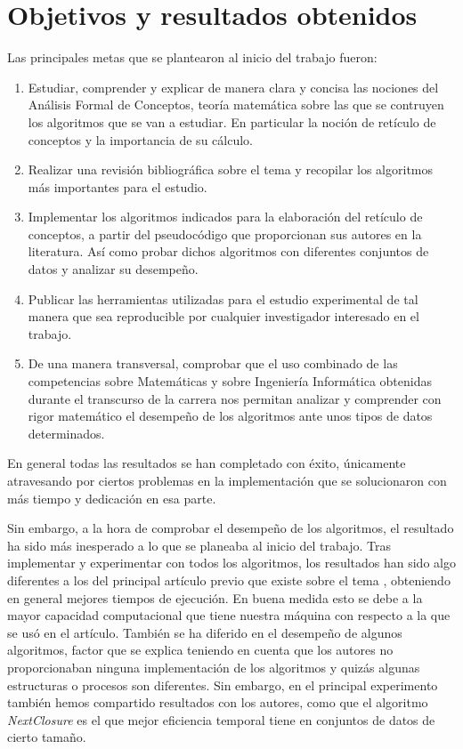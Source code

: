 \documentclass[oneside,openright,titlepage,numbers=noenddot,openany,headinclude,footinclude=true,
cleardoublepage=empty,abstractoff,BCOR=5mm,paper=a4,fontsize=12pt,main=spanish]{scrreprt}
\begin{document}
\section{Objetivos y resultados obtenidos}

Las principales metas que se plantearon al inicio del trabajo fueron:

\begin{enumerate}
    \item Estudiar, comprender y explicar de manera clara y concisa las nociones del Análisis Formal de Conceptos, teoría matemática sobre las que se contruyen los algoritmos que se van a estudiar. En particular la noción de retículo de conceptos y la importancia de su cálculo.
    \item Realizar una revisión bibliográfica sobre el tema y recopilar los algoritmos más importantes para el estudio.
    \item Implementar los algoritmos indicados para la elaboración del retículo de conceptos, a partir del pseudocódigo que proporcionan sus autores en la literatura. Así como probar dichos algoritmos con diferentes conjuntos de datos y analizar su desempeño.
    \item Publicar las herramientas utilizadas para el estudio experimental de tal manera que sea reproducible por cualquier investigador interesado en el trabajo.
    \item De una manera transversal, comprobar que el uso combinado de las competencias sobre Matemáticas y sobre Ingeniería Informática obtenidas durante el transcurso de la carrera  nos permitan analizar y comprender con rigor matemático el desempeño  de los algoritmos ante unos tipos de datos determinados.
\end{enumerate}

En general todas las resultados se han completado con éxito, únicamente atravesando por ciertos problemas en la implementación que se solucionaron con más tiempo y dedicación en esa parte. 

Sin embargo, a la hora de comprobar el desempeño de los algoritmos, el resultado ha sido más inesperado a lo que se planeaba al inicio del trabajo. Tras implementar y experimentar con todos los algoritmos, los resultados han sido algo diferentes a los del principal artículo previo que existe sobre el tema \cite{comparingperformance}, obteniendo en general mejores tiempos de ejecución. En buena medida esto se debe a la mayor capacidad computacional que tiene nuestra máquina con respecto a la que se usó en el artículo. También se ha diferido en el desempeño de algunos algoritmos, factor que se explica teniendo en cuenta que los autores no proporcionaban ninguna implementación de los algoritmos y quizás algunas estructuras o procesos son diferentes. Sin embargo, en el principal experimento también hemos compartido resultados con los autores, como que el algoritmo \textit{NextClosure} es el que mejor eficiencia temporal tiene en conjuntos de datos de cierto tamaño. 
\end{document}
